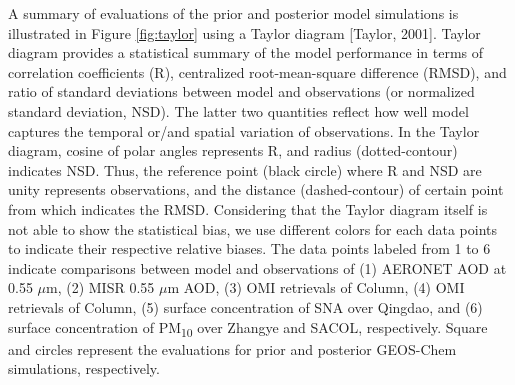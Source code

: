  A summary of evaluations of the prior and posterior model simulations
 is illustrated in Figure \ref{fig:taylor} using a Taylor diagram [Taylor, 2001].
 Taylor diagram provides a statistical summary of the model performance
 in terms of correlation coefficients (R), centralized root-mean-square difference (RMSD),
 and ratio of standard deviations between model and observations (or normalized standard deviation, NSD).
 The latter two quantities reflect how well model captures
 the temporal or/and spatial variation of observations.
 In the Taylor diagram, cosine of polar angles represents R, and radius (dotted-contour) indicates NSD.
 Thus, the reference point (black circle) where R and NSD are unity represents observations,
 and the distance (dashed-contour) of certain point from which indicates the RMSD.
 Considering that the Taylor diagram itself is not able to show the statistical bias,
 we use different colors for each data points to indicate their respective relative biases.
 The data points labeled from 1 to 6 indicate comparisons between model and observations of
 (1) AERONET AOD at 0.55 $\mu$m,
 (2) MISR 0.55 $\mu$m AOD,
 (3) OMI retrievals of  Column,
 (4) OMI retrievals of  Column,
 (5) surface concentration of SNA over Qingdao, and
 (6) surface concentration of PM\textsubscript{10} over Zhangye and SACOL, respectively.
 Square and circles represent the evaluations for prior and posterior GEOS-Chem simulations, respectively.

